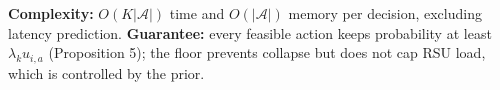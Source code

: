 \documentclass[10pt]{article}
\begin{document}
\vspace{3pt}
\footnotesize
\textbf{Complexity:} $O(K|\mathcal A|)$ time and $O(|\mathcal A|)$ memory per decision, excluding latency prediction.
\textbf{Guarantee:} every feasible action keeps probability at least $\lambda_{k}u_{i,a}$ (Proposition 5); the floor prevents collapse but does not cap RSU load, which is controlled by the prior.
\end{document}
